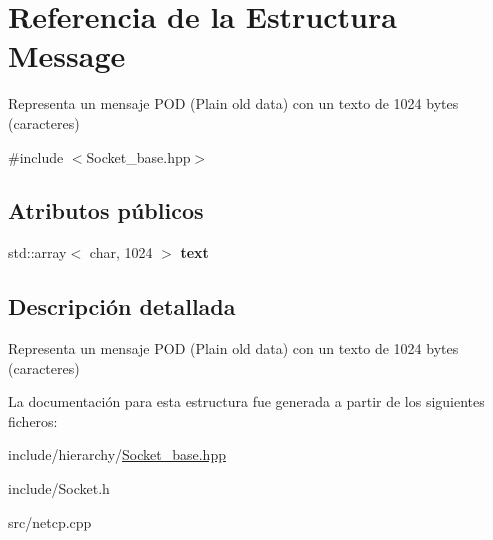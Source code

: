 \hypertarget{structMessage}{}\section{Referencia de la Estructura Message}
\label{structMessage}


Representa un mensaje P\+OD (Plain old data) con un texto de 1024 bytes (caracteres)  




{\ttfamily \#include $<$Socket\+\_\+base.\+hpp$>$}

\subsection*{Atributos públicos}
\begin{DoxyCompactItemize}
\item 
\mbox{\label{structMessage_a27f530284040a1667ce2fd49eff4f55c}} 
std\+::array$<$ char, 1024 $>$ {\bfseries text}
\end{DoxyCompactItemize}


\subsection{Descripción detallada}
Representa un mensaje P\+OD (Plain old data) con un texto de 1024 bytes (caracteres) 

La documentación para esta estructura fue generada a partir de los siguientes ficheros\+:\begin{DoxyCompactItemize}
\item 
include/hierarchy/\hyperlink{Socket__base_8hpp}{Socket\+\_\+base.\+hpp}\item 
include/Socket.\+h\item 
src/netcp.\+cpp\end{DoxyCompactItemize}
